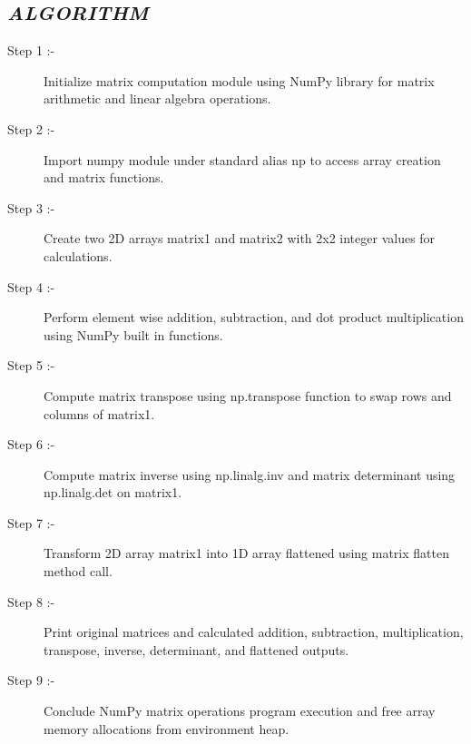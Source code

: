\documentclass[11pt,a4paper]{article}
\begin{document}
\subsection*{\textit{ALGORITHM}}
\begin{description}
  \item[Step 1 :-] Initialize matrix computation module using NumPy library for matrix arithmetic and linear algebra operations.
  \item[Step 2 :-] Import numpy module under standard alias np to access array creation and matrix functions.
  \item[Step 3 :-] Create two 2D arrays matrix1 and matrix2 with 2x2 integer values for calculations.
  \item[Step 4 :-] Perform element wise addition, subtraction, and dot product multiplication using NumPy built in functions.
  \item[Step 5 :-] Compute matrix transpose using np.transpose function to swap rows and columns of matrix1.
  \item[Step 6 :-] Compute matrix inverse using np.linalg.inv and matrix determinant using np.linalg.det on matrix1.
  \item[Step 7 :-] Transform 2D array matrix1 into 1D array flattened using matrix flatten method call.
  \item[Step 8 :-] Print original matrices and calculated addition, subtraction, multiplication, transpose, inverse, determinant, and flattened outputs.
  \item[Step 9 :-] Conclude NumPy matrix operations program execution and free array memory allocations from environment heap.
\end{description}
\end{document}
